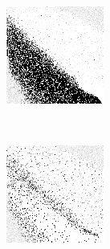 
\begin{figure}
\center

	\begin{subfigure}[t]{0.22\textwidth}
		\includegraphics[width=\textwidth]{images/findings/round1/strategies_handmaxmin.png}
		\caption{\handmaxmin}
	\end{subfigure}
	~
	\begin{subfigure}[t]{0.22\textwidth}
		\includegraphics[width=\textwidth]{images/findings/round1/strategies_handmaxavg.png}

\end{subfigure}
\end{figure}
